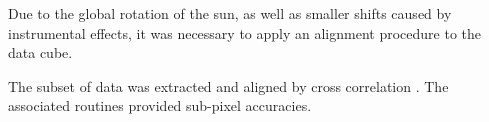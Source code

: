 
Due to the global rotation of the sun, as well as smaller shifts caused
by instrumental effects, it was necessary to apply an alignment procedure
to the data cube.

The subset of data was extracted and aligned by cross correlation
\citep{McAteer2003, McAteer2004}.
The associated routines provided sub-pixel accuracies.
